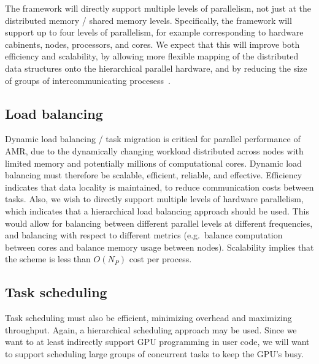 \documentclass[10pt]{article}
\begin{document}
The framework will directly support multiple levels of parallelism,
not just at the distributed memory / shared memory levels.
Specifically, the framework will support up to four levels of
parallelism, for example corresponding to hardware cabinents, nodes,
processors, and cores.  We expect that this will improve both
efficiency and scalability, by allowing more flexible mapping of the
distributed data structures onto the hierarchical parallel hardware,
and by reducing the size of groups of intercommunicating
procesess~\cite{BaBu09}.

\subsection{Load balancing} \label{ss:require-balance}

Dynamic load balancing / task migration is critical for parallel
performance of AMR, due to the dynamically changing workload
distributed across nodes with limited memory and potentially millions
of computational cores.  Dynamic load balancing must therefore be
scalable, efficient, reliable, and effective.  Efficiency indicates
that data locality is maintained, to reduce communication costs
between tasks.  Also, we wish to directly support multiple levels of
hardware parallelism, which indicates that a hierarchical load
balancing approach should be used.  This would allow for balancing
between different parallel levels at different frequencies, and
balancing with respect to different metrics (e.g.~balance computation
between cores and balance memory usage between nodes).  Scalability
implies that the scheme is less than $O(N_P)$ cost per process.

\subsection{Task scheduling}\label{ss:require-schedule}

Task scheduling must also be efficient, minimizing overhead and
maximizing throughput.  Again, a hierarchical scheduling approach may
be used.  Since we want to at least indirectly support GPU programming
in user code, we will want to support scheduling large groups of
concurrent tasks to keep the GPU's busy.
\end{document}
